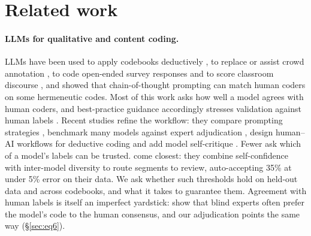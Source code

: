 \section{Related work}
\label{sec:related}

\paragraph{LLMs for qualitative and content coding.} LLMs have been used to apply codebooks deductively
\citep{xiao2023supporting,chew2023llm}, to replace or assist crowd annotation \citep{gilardi2023chatgpt,ziems2024can}, to
code open-ended survey responses \citep{mellon2024ais} and to score classroom discourse \citep{wang2023chatgpt}, and
\citet{dunivin2025scaling} showed that chain-of-thought prompting can match human coders on some hermeneutic codes. Most of
this work asks how well a model agrees with human coders, and best-practice guidance accordingly stresses validation against
human labels \citep{pangakis2023automated,tornberg2024best}. Recent studies refine the workflow: they compare prompting
strategies \citep{rodrigueztriana2026one}, benchmark many models against expert adjudication \citep{marston2026humanitarian},
design human--AI workflows for deductive coding \citep{li2025fallshort,matveyenko2025blended,yuan2026calico} and add model
self-critique \citep{dunivin2026selfreflection}. Fewer ask which of a model's labels can be trusted. \citet{zhao2025confidence}
come closest: they combine self-confidence with inter-model diversity to route segments to review, auto-accepting 35\% at
under 5\% error on their data. We ask whether such thresholds hold on held-out data and across codebooks, and what it takes
to guarantee them. Agreement with human labels is itself an imperfect yardstick: \citet{liu2026agreement} show that blind
experts often prefer the model's code to the human consensus, and our adjudication points the same way (\S\ref{sec:eq6}).

